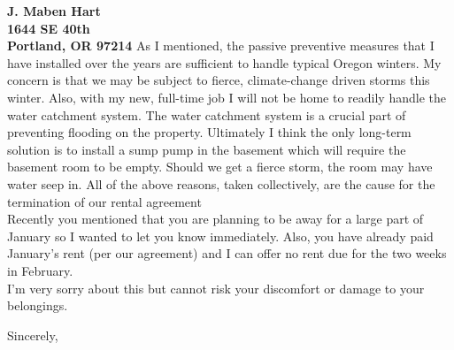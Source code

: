 \documentclass[11pt]{letter} %
\begin{document}
\begin{letter}{\large \bfseries J. Maben Hart \\ 1644 SE 40th \\ Portland, OR 97214}
As I mentioned, the passive preventive measures that I have installed over the years are sufficient to handle typical Oregon winters. My concern is that we may be subject to fierce, climate-change driven storms this winter. Also, with my new, full-time job I will not be home to readily handle the water catchment system. The water catchment system is a crucial part of preventing flooding on the property. Ultimately I think the only long-term solution is to install a sump pump in the basement which will require the basement room to be empty. Should we get a fierce storm, the room may have water seep in. All of the above reasons, taken collectively, are the cause for the termination of our rental agreement\\

Recently you mentioned that you are planning to be away for a large part of January so I wanted to let you know immediately. Also, you have already paid January's rent (per our agreement) and I can offer no rent due for the two weeks in February.\\

I'm very sorry about this but cannot risk your discomfort or damage to your belongings.


\closing{Sincerely,}

\end{letter}
\end{document}
